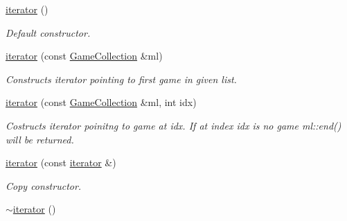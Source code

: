 \begin{DoxyCompactItemize}
\item 
\hypertarget{classpgn_1_1GameCollection_1_1iterator_a3b829c9fb4ca641aa3b972bff1a8e886}{
\hyperlink{classpgn_1_1GameCollection_1_1iterator_a3b829c9fb4ca641aa3b972bff1a8e886}{iterator} ()}
\label{classpgn_1_1GameCollection_1_1iterator_a3b829c9fb4ca641aa3b972bff1a8e886}

\begin{DoxyCompactList}\small\item\em Default constructor. \item\end{DoxyCompactList}\item 
\hyperlink{classpgn_1_1GameCollection_1_1iterator_a954bdfa9e2ea94b55bae8aae2f805887}{iterator} (const \hyperlink{classpgn_1_1GameCollection}{GameCollection} \&ml)
\begin{DoxyCompactList}\small\item\em Constructs iterator pointing to first game in given list. \item\end{DoxyCompactList}\item 
\hyperlink{classpgn_1_1GameCollection_1_1iterator_a41ba111b559fdfe85a970c98c8ed7093}{iterator} (const \hyperlink{classpgn_1_1GameCollection}{GameCollection} \&ml, int idx)
\begin{DoxyCompactList}\small\item\em Costructs iterator poinitng to game at idx. If at index idx is no game ml::end() will be returned. \item\end{DoxyCompactList}\item 
\hypertarget{classpgn_1_1GameCollection_1_1iterator_a4414c98751c5d952c8ae79ea46c44bcb}{
\hyperlink{classpgn_1_1GameCollection_1_1iterator_a4414c98751c5d952c8ae79ea46c44bcb}{iterator} (const \hyperlink{classpgn_1_1GameCollection_1_1iterator}{iterator} \&)}
\label{classpgn_1_1GameCollection_1_1iterator_a4414c98751c5d952c8ae79ea46c44bcb}

\begin{DoxyCompactList}\small\item\em Copy constructor. \item\end{DoxyCompactList}\item 
\hypertarget{classpgn_1_1GameCollection_1_1iterator_a6662899f24368d80f69645c4e3c417df}{
\hyperlink{classpgn_1_1GameCollection_1_1iterator_a6662899f24368d80f69645c4e3c417df}{$\sim$iterator} ()}
\label{classpgn_1_1GameCollection_1_1iterator_a6662899f24368d80f69645c4e3c417df}


\end{DoxyCompactItemize}
